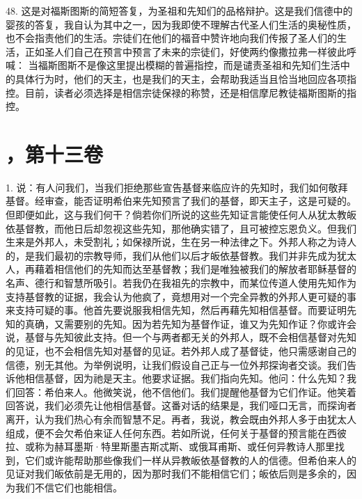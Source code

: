 48. 这是对福斯图斯的简短答复，为圣祖和先知们的品格辩护。这是我们信德中的婴孩的答复，我自认为其中之一，因为我即使不理解古代圣人们生活的奥秘性质，也不会指责他们的生活。宗徒们在他们的福音中赞许地向我们传报了圣人们的生活，正如圣人们自己在预言中预言了未来的宗徒们，好使两约像撒拉弗一样彼此呼喊：  当福斯图斯不是像这里提出模糊的普遍指控，而是谴责圣祖和先知们生活中的具体行为时，他们的天主，也是我们的天主，会帮助我适当且恰当地回应各项指控。目前，读者必须选择是相信宗徒保禄的称赞，还是相信摩尼教徒福斯图斯的指控。\par



\section{，第十三卷}

\par

1. 说：有人问我们，当我们拒绝那些宣告基督来临应许的先知时，我们如何敬拜基督。经审查，能否证明希伯来先知预言了我们的基督，即天主子，这是可疑的。但即便如此，这与我们何干？倘若你们所说的这些先知证言能使任何人从犹太教皈依基督教，而他日后却忽视这些先知，那他确实错了，且可被控忘恩负义。但我们生来是外邦人，未受割礼；如保禄所说，生在另一种法律之下。外邦人称之为诗人的，是我们最初的宗教导师，我们从他们以后才皈依基督教。我们并非先成为犹太人，再藉着相信他们的先知而达至基督教；我们是唯独被我们的解放者耶稣基督的名声、德行和智慧所吸引。若我仍在我祖先的宗教中，而某位传道人使用先知作为支持基督教的证据，我会认为他疯了，竟想用对一个完全异教的外邦人更可疑的事来支持可疑的事。他首先要说服我相信先知，然后再藉先知相信基督。而要证明先知的真确，又需要别的先知。因为若先知为基督作证，谁又为先知作证？你或许会说，基督与先知彼此支持。但一个与两者都无关的外邦人，既不会相信基督对先知的见证，也不会相信先知对基督的见证。若外邦人成了基督徒，他只需感谢自己的信德，别无其他。为举例说明，让我们假设自己正与一位外邦探询者交谈。我们告诉他相信基督，因为祂是天主。他要求证据。我们指向先知。他问：什么先知？我们回答：希伯来人。他微笑说，他不信他们。我们提醒他基督为它们作证。他笑着回答说，我们必须先让他相信基督。这番对话的结果是，我们哑口无言，而探询者离开，认为我们热心有余而智慧不足。再者，我说，教会既由外邦人多于由犹太人组成，便不会欠希伯来证人任何东西。若如所说，任何关于基督的预言能在西彼拉、或称为赫耳墨斯·特里斯墨吉斯忒斯、或俄耳甫斯、或任何异教诗人那里找到，它们或许能帮助那些像我们一样从异教皈依基督教的人的信德。但希伯来人的见证对我们皈依前是无用的，因为那时我们不能相信它们；皈依后则是多余的，因为我们不信它们也能相信。\par

